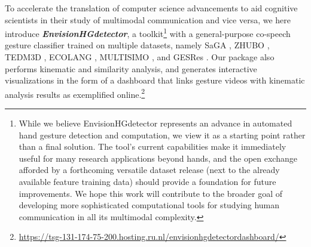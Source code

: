 \documentclass[11pt,smallheadings,cleardoublepage=empty,tocflat,numbers=noenddot,twoside,captions=tableheading]{scrbook}
\begin{document}
\begin{refsection}
To accelerate the translation of computer science advancements to aid cognitive scientists in their study of multimodal communication and vice versa, we here introduce \textit{\textbf{EnvisionHGdetector}}, a toolkit\footnote{While we believe EnvisionHGdetector represents an advance in automated hand gesture detection and computation, we view it as a starting point rather than a final solution. The tool's current capabilities make it immediately useful for many research applications beyond hands, and the open exchange afforded by a forthcoming versatile dataset release (next to the already available feature training data) should provide a foundation for future improvements. We hope this work will contribute to the broader goal of developing more sophisticated computational tools for studying human communication in all its multimodal complexity.} with a general-purpose co-speech gesture classifier trained on multiple datasets, namely SaGA \parencite{luckingBielefeldSpeechGesture2010}, ZHUBO \parencite{baoEditableCoSpeechGesture2024}, TEDM3D \parencite{rohrerTemporalPragmaticAnalysis2022}, ECOLANG \parencite{guECOLANGMultimodalCorpus2025}, MULTISIMO \parencite{koutsombogeraModelingCollaborativeMultimodal2018, koutsombogeraMULTISIMOMultimodalCorpus2017}, and GESRes \parencite{hensel2025richly}. Our package also performs kinematic and similarity analysis, and generates interactive visualizations in the form of a dashboard that links gesture videos with kinematic analysis results as exemplified online.\footnote{\url{https://tsg-131-174-75-200.hosting.ru.nl/envisionhgdetectordashboard/}}


\end{refsection}
\end{document}
